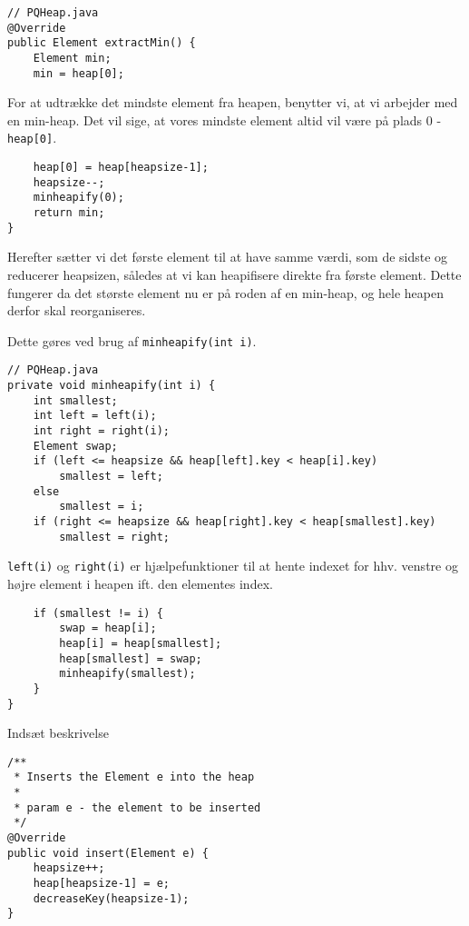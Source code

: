 \documentclass{article}
\begin{document}
\begin{lstlisting}
// PQHeap.java
@Override
public Element extractMin() {
    Element min;
    min = heap[0];    
\end{lstlisting}
For at udtrække det mindste element fra heapen, benytter vi, at vi arbejder med en min-heap. Det vil sige, at vores mindste element altid vil være på plads 0 - \texttt{heap[0]}.
\begin{lstlisting}    
    heap[0] = heap[heapsize-1];
    heapsize--;
    minheapify(0);
    return min;
}
\end{lstlisting}
Herefter sætter vi det første element til at have samme værdi, som de sidste og reducerer heapsizen, således at vi kan heapifisere direkte fra første element. Dette fungerer da det største element nu er på roden af en min-heap, og hele heapen derfor skal reorganiseres. \newline

\noindent Dette gøres ved brug af \texttt{minheapify(int i)}.
\begin{lstlisting}
// PQHeap.java
private void minheapify(int i) {
    int smallest;
    int left = left(i);
    int right = right(i);
    Element swap;
    if (left <= heapsize && heap[left].key < heap[i].key)
        smallest = left;
    else
        smallest = i;
    if (right <= heapsize && heap[right].key < heap[smallest].key)
        smallest = right;
\end{lstlisting}
\texttt{left(i)} og \texttt{right(i)} er hjælpefunktioner til at hente indexet for hhv. venstre og højre element i heapen ift. den elementes index.
\begin{lstlisting}
    if (smallest != i) {
        swap = heap[i];
        heap[i] = heap[smallest];
        heap[smallest] = swap;
        minheapify(smallest);
    }
}
\end{lstlisting}


Indsæt beskrivelse
\begin{lstlisting}
/**
 * Inserts the Element e into the heap
 *
 * param e - the element to be inserted
 */
@Override
public void insert(Element e) {
    heapsize++;
    heap[heapsize-1] = e;
    decreaseKey(heapsize-1);
}
\end{lstlisting}


\newpage
\end{document}
